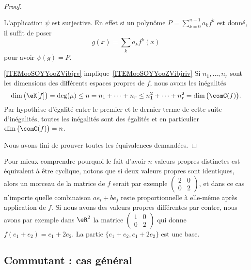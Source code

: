 \begin{proof}
\begin{subproof}
		L'application \( \psi\) est surjective. En effet si un polynôme \( P=\sum_{k=0}^{n-1}a_kf^k\) est donné, il suffit de poser
		\begin{equation}
			g(x)=\sum_ka_kf^k(x)
		\end{equation}
		pour avoir \( \psi(g)=P \).
		\item[\ref{ITEMooSOYYooZVibjrv} implique~\ref{ITEMooSOYYooZVibjriv}]
		Si \( n_1,\ldots, n_r\) sont les dimensions des différents espaces propres de \( f\), nous avons les inégalités
		\begin{equation}
			\dim\big( \eK[f] \big)=\deg(\mu)\leq n=n_1+\cdots +n_r\leq n_1^2+\cdots +n_r^2=\dim\big( \comC(f) \big).
		\end{equation}
		Par hypothèse d'égalité entre le premier et le dernier terme de cette suite d'inégalités, toutes les inégalités sont des égalités et en particulier \( \dim\big( \comC(f) \big)=n\).
	\end{subproof}
	Nous avons fini de prouver toutes les équivalences demandées.
\end{proof}

\begin{example}
	Pour mieux comprendre pourquoi le fait d'avoir \( n\) valeurs propres distinctes est équivalent à être cyclique, notons que si deux valeurs propres sont identiques, alors un morceau de la matrice de \( f\) serait par exemple \( \begin{pmatrix}
		2 & 0 \\
		0 & 2
	\end{pmatrix}\), et dans ce cas n'importe quelle combinaison \( ae_i+be_j\) reste proportionnelle à elle-même après application de \( f\). Si nous avons des valeurs propres différentes par contre, nous avons par exemple dans \( \eR^2\) la matrice \( \begin{pmatrix}
		1 & 0 \\
		0 & 2
	\end{pmatrix}\) qui donne \( f(e_1+e_2)=e_1+2e_2\). La partie \( \{ e_1+e_2,e_1+2e_2 \}\) est une base.
\end{example}

\subsection{Commutant : cas général}

